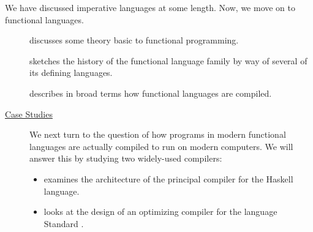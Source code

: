 \label{functional:overview}
We have discussed imperative languages at some length. Now, we move on to functional languages.

\begin{description}
\item[] discusses some theory basic to functional programming.
\item[] sketches the history of the functional language family by way of several of its defining languages.
\item[] describes in broad terms how functional languages are compiled. %
\item[\href{\#casestudies}{Case Studies}] We next turn to the question of how programs in modern functional languages are actually compiled to run on modern computers. We will answer this by studying two widely-used compilers:
\begin{itemize}
\item {} examines the architecture of the principal compiler for the Haskell language.
\item {} looks at the design of an optimizing compiler for the language Standard .
\end{itemize}
\end{description}